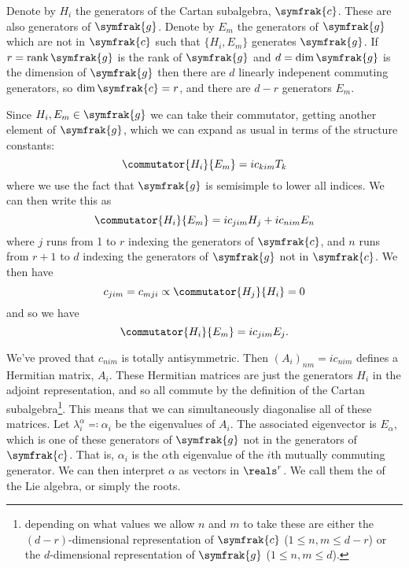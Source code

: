 \documentclass[fleqn]{NotesClass}
\renewcommand{\lie}[1]{\symfrak{#1}}
\DeclareMathOperator{\rank}{rank}
\begin{document}
    Denote by \(H_i\) the generators of the Cartan subalgebra, \(\lie{c}\).
    These are also generators of \(\lie{g}\).
    Denote by \(E_m\) the generators of \(\lie{g}\) which are not in \(\lie{c}\) such that \(\{H_i, E_m\}\) generates \(\lie{g}\).
    If \(r = \rank \lie{g}\) is the rank of \(\lie{g}\) and \(d = \dim \lie{g}\) is the dimension of \(\lie{g}\) then there are \(d \) linearly indepenent commuting generators, so \(\dim\lie{c} = r\), and there are \(d - r\) generators \(E_m\).
    
    Since \(H_i, E_m \in \lie{g}\) we can take their commutator, getting another element of \(\lie{g}\), which we can expand as usual in terms of the structure constants:
    \begin{equation}
        \commutator{H_i}{E_m} = ic_{kim}T_k
    \end{equation}
    where we use the fact that \(\lie{g}\) is semisimple to lower all indices.
    We can then write this as
    \begin{equation}
        \commutator{H_i}{E_m} = ic_{jim}H_j + ic_{nim}E_n
    \end{equation}
    where \(j\) runs from 1 to \(r\) indexing the generators of \(\lie{c}\), and \(n\) runs from \(r + 1\) to \(d\) indexing the generators of \(\lie{g}\) not in \(\lie{c}\).
    We then have
    \begin{equation}
        c_{jim} = c_{mji} \propto \commutator{H_j}{H_i} = 0
    \end{equation}
    and so we have
    \begin{equation}
        \commutator{H_i}{E_m} = ic_{jim}E_j.
    \end{equation}
    
    We've proved that \(c_{nim}\) is totally antisymmetric.
    Then \((A_i)_{nm} = ic_{nim}\) defines a Hermitian matrix, \(A_i\).
    These Hermitian matrices are just the generators \(H_i\) in the adjoint representation, and so all commute by the definition of the Cartan subalgebra\footnote{depending on what values we allow \(n\) and \(m\) to take these are either the \((d-r)\)-dimensional representation of \(\lie{c}\) (\(1 \le n, m \le d - r\)) or the \(d\)-dimensional representation of \(\lie{g}\) (\(1 \le n, m \le d\)).}.
    This means that we can simultaneously diagonalise all of these matrices.
    Let \(\lambda_i^\alpha \eqqcolon \alpha_i\) be the eigenvalues of \(A_i\).
    The associated eigenvector is \(E_\alpha\), which is one of these generators of \(\lie{g}\) not in the generators of \(\lie{c}\).
    That is, \(\alpha_i\) is the \(\alpha\)th eigenvalue of the \(i\)th mutually commuting generator.
    We can then interpret \(\alpha\) as vectors in \(\reals^r\).
    We call them the  of the Lie algebra, or simply the roots.
    
\end{document}

